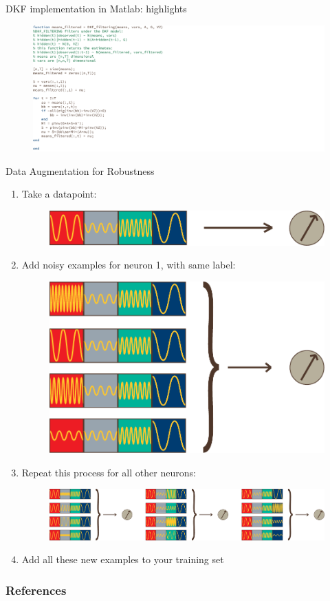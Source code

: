 \documentclass[aspectratio=169,19pt,xetex,handout]{beamer}
\begin{document}
\begin{frame}{DKF implementation in Matlab: highlights}
\begin{figure}
\includegraphics[width=\textwidth]{dkf-matlab}
\end{figure}
\end{frame}

\begin{frame}{Data Augmentation for Robustness}
\Large
\begin{enumerate}
    \item Take a datapoint:
    \begin{figure}
        \includegraphics[height=0.03\textwidth]{data_aug1}
    \end{figure}
    \item Add noisy examples for neuron 1, with same label:
    \begin{figure}
        \includegraphics[height=0.1\textwidth]{data_aug2}
    \end{figure}
    \item Repeat this process for all other neurons:
    \begin{figure}
        \includegraphics[height=0.1\textwidth]{data_aug3}
    \end{figure}
    \item Add all these new examples to your training set
\end{enumerate}

\end{frame}

\begin{frame}[allowframebreaks]
  \frametitle{References}
  \printbibliography
\end{frame}
\end{document}
